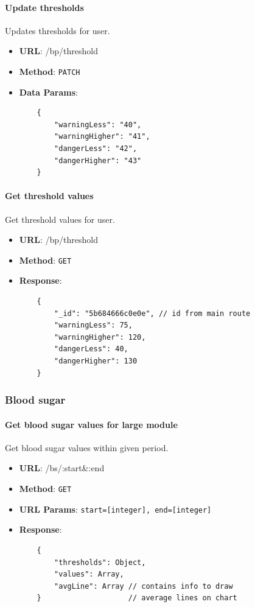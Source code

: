         \paragraph{Update thresholds} Updates thresholds for user.
        \begin{itemize}
            \item \textbf{URL}: /bp/threshold
            \item \textbf{Method}: \texttt{PATCH}
            \item \textbf{Data Params}: \begin{verbatim}
    {
        "warningLess": "40",
        "warningHigher": "41",
        "dangerLess": "42",
        "dangerHigher": "43"
    }  
            \end{verbatim}
        \end{itemize}

        \paragraph{Get threshold values} Get threshold values for user.
        \begin{itemize}
            \item \textbf{URL}: /bp/threshold
            \item \textbf{Method}: \texttt{GET}
            \item \textbf{Response}: \begin{verbatim}
    {
        "_id": "5b684666c0e0e", // id from main route
        "warningLess": 75,
        "warningHigher": 120,
        "dangerLess": 40,
        "dangerHigher": 130
    }
            \end{verbatim}
        \end{itemize}

    \subsubsection{Blood sugar}

        \paragraph{Get blood sugar values for large module} Get blood sugar values within given period.
        \begin{itemize}
            \item \textbf{URL}: /bs/:start\&:end
            \item \textbf{Method}: \texttt{GET}
            \item \textbf{URL Params}: \texttt{start=[integer], end=[integer]}
            \item \textbf{Response}: \begin{verbatim}
    {
        "thresholds": Object,
        "values": Array,
        "avgLine": Array // contains info to draw 
    }                    // average lines on chart
            \end{verbatim}
        \end{itemize}

